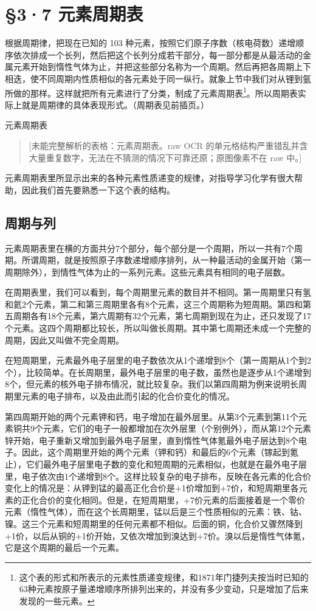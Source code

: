 \section{§3·7 元素周期表}

根据周期律，把现在已知的 103
种元素，按照它们原子序数（核电荷数）递增顺序依次排成一个长列，然后把这个长列分成若干部分，每一部分都是从最活动的金属元素开始到惰性气体为止，并把这些部分名称为一个周期。然后再把各周期上下相迭，使不同周期内性质相似的各元素处于同一纵行。就象上节中我们对从锂到氩所做的那样。这样就把所有元素进行了分类，制成了元素周期表\footnote{这个表的形式和所表示的元素性质递变规律，和1871年门捷列夫按当时已知的63种元素按原子量递增顺序所排列出来的，并没有多少变动，只是增加了后来发现的一些元素。}。所以周期表实际上就是周期律的具体表现形式。（周期表见前插页。）

元素周期表

\begin{quote}
{[}未能完整解析的表格：元素周期表。raw OCR
的单元格结构严重错乱并含大量重复数字，无法在不猜测的情况下可靠还原；原图像素不在
raw 中。{]}
\end{quote}

元素周期表里所显示出来的各种元素性质递变的规律，对指导学习化学有很大帮助，因此我们首先要熟悉一下这个表的结构。

\subsection{周期与列}

元素周期表里在横的方面共分7个部分，每个部分是一个周期，所以一共有7个周期。所谓周期，就是按照原子序数递增顺序排列，从一种最活动的金属开始（第一周期除外），到情性气体为止的一系列元素。这些元素具有相同的电子层数。

在周期表里，我们可以看到，每个周期里元素的数目并不相同。第一周期里只有氢和氦2个元素，第二和第三周期里各有8个元素，这三个周期称为短周期。第四和第五周期各有18个元素，第六周期有32个元素，第七周期到现在为止，还只发现了17个元素。这四个周期都比较长，所以叫做长周期。其中第七周期还未成一个完整的周期，因此又叫做不完全周期。

在短周期里，元素最外电子层里的电子数依次从1个递增到8个（第一周期从1个到2个），比较简单。在长周期里，最外电子层里的电子数，虽然也是逐步从1个递增到8个，但元素的核外电子排布情况，就比较复杂。我们以第四周期为例来说明长周期里元素的电子排布，以及由此而引起的化合价变化的情况。

第四周期开始的两个元素钾和钙，电子增加在最外层里。从第3个元素到第11个元素铜共9个元素，它们的电子一般都增加在次外层里（个别例外），而从第12个元素锌开始，电子重新又增加到最外电子层里，直到惰性气体氪最外电子层达到8个电子。因此，这个周期里开始的两个元素（钾和钙）和最后的6个元素（镓起到氪止），它们最外电子层里电子数的变化和短周期的元素相似，也就是在最外电子层里，电子依次由1个递增到8个。这样比较复杂的电子排布，反映在各元素的化合价变化上的情况是：从钾到锰的最高正化合价是+1价增加到+7价，和短周期里各元素的正化合价的变化相同。但是，在短周期里，+7价元素的后面接着是一个零价元素（惰性气体），而在这个长周期里，锰以后是三个性质相似的元素：铁、钴、镍。这三个元素和短周期里的任何元素都不相似。后面的铜，化合价又骤然降到+1价，以后从铜的+1价开始，又依次增加到溴达到+7价。溴以后是惰性气体氪，它是这个周期的最后一个元素。

